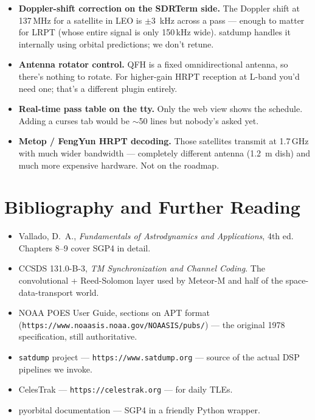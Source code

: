 \documentclass[11pt,a4paper]{article}
\begin{document}
\begin{itemize}
  \item \textbf{Doppler-shift correction on the SDRTerm side.}
        The Doppler shift at 137\,MHz for a satellite in LEO is
        \(\pm\)\SI{3}{kHz} across a pass — enough to matter for LRPT
        (whose entire signal is only 150\,kHz wide).  satdump handles
        it internally using orbital predictions; we don't retune.
  \item \textbf{Antenna rotator control.}  QFH is a fixed
        omnidirectional antenna, so there's nothing to rotate.  For
        higher-gain HRPT reception at L-band you'd need one; that's
        a different plugin entirely.
  \item \textbf{Real-time pass table on the tty.}  Only the web view
        shows the schedule.  Adding a curses tab would be $\sim$50
        lines but nobody's asked yet.
  \item \textbf{Metop / FengYun HRPT decoding.}  Those satellites
        transmit at 1.7\,GHz with much wider bandwidth — completely
        different antenna (\SI{1.2}{m} dish) and much more expensive
        hardware.  Not on the roadmap.
\end{itemize}

\section{Bibliography and Further Reading}

\begin{itemize}
  \item Vallado, D.\ A., \emph{Fundamentals of Astrodynamics and
        Applications}, 4th ed.  Chapters 8--9 cover SGP4 in detail.
  \item CCSDS 131.0-B-3, \emph{TM Synchronization and Channel
        Coding}.  The convolutional + Reed-Solomon layer used by
        Meteor-M and half of the space-data-transport world.
  \item NOAA POES User Guide, sections on APT format
        (\texttt{https://www.noaasis.noaa.gov/NOAASIS/pubs/}) — the
        original 1978 specification, still authoritative.
  \item \texttt{satdump} project — \texttt{https://www.satdump.org} —
        source of the actual DSP pipelines we invoke.
  \item CelesTrak — \texttt{https://celestrak.org} — for daily TLEs.
  \item pyorbital documentation — SGP4 in a friendly Python wrapper.
\end{itemize}
\end{document}
